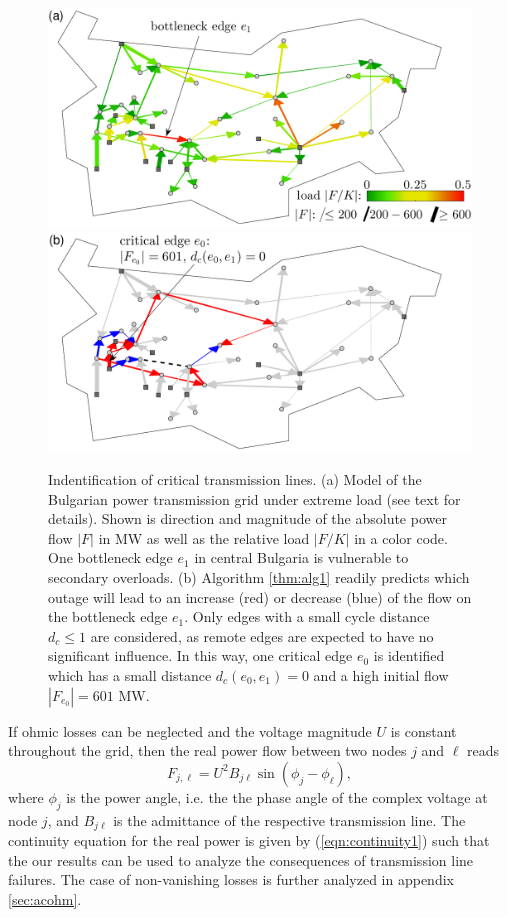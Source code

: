 \documentclass[10pt,aps,pra,twocolumn,superscriptaddress]{revtex4-1}
\newcommand{\be}{\begin{equation}}
\newcommand{\ee}{\end{equation}}
\begin{document}
\begin{figure}
    \includegraphics[width=\columnwidth]{pics/bulgaria15_iniload.pdf}
    \includegraphics[width=\columnwidth]{pics/bulgaria15_change.pdf}
    \caption{\label{fig:bulgaria1}
    Indentification of critical transmission lines.
    (a) Model of the Bulgarian power transmission grid under extreme load (see text for details).
    Shown is direction and magnitude of the absolute power flow $|F|$ in MW as well as the
    relative load $|F/K|$ in a color code. One bottleneck edge $e_1$ in central Bulgaria 
    is vulnerable to secondary overloads.
    (b) Algorithm \ref{thm:alg1} readily predicts which outage will lead
    to an increase (red) or decrease (blue) of the flow on the bottleneck edge $e_1$. 
    Only edges with a small cycle distance $d_c \le 1$ are considered, as remote edges
    are expected to have no significant influence. In this way, one critical edge $e_0$     
    is identified which has a small distance $d_c(e_0,e_1) = 0$ and a high initial
    flow $|F_{e_0}| = 601$ MW. 
    }
\end{figure}

If ohmic losses can be neglected and the voltage magnitude $U$ is constant throughout the grid,
then the real power flow between two nodes $j$ and $\ell$ reads \cite{Wood13,12powergrid}
\be
      F_{j,\ell} =  U^2 B_{j\ell} \sin(\phi_{j} - \phi_\ell ),   
\ee
where $\phi_j$ is the power angle, i.e. the the phase angle of the complex voltage at
node $j$, and $B_{j \ell}$ is the admittance of the respective transmission line.
The continuity equation for the real power is given by (\ref{eqn:continuity1})
such that the our results can be used to analyze the consequences of transmission
line failures. The case of non-vanishing losses is further analyzed in appendix
\ref{sec:acohm}.
 
\end{document}
